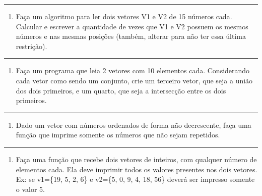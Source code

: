 \documentclass[12pt,a4paper]{article}
\renewcommand{\linethickness}{0.05em}
\providecommand{\tightlist}{%
      \setlength{\itemsep}{0pt}\setlength{\parskip}{0pt}}
\begin{document}
    \begin{center}\rule{0.5\linewidth}{\linethickness}\end{center}

\begin{enumerate}
\def\labelenumi{\arabic{enumi}.}
\setcounter{enumi}{11}
\tightlist
\item
  Faça um algoritmo para ler dois vetores V1 e V2 de 15 números cada.
  Calcular e escrever a quantidade de vezes que V1 e V2 possuem os
  mesmos números e nas mesmas posições (também, alterar para não ter
  essa última restrição).
\end{enumerate}

    \begin{center}\rule{0.5\linewidth}{\linethickness}\end{center}

\begin{enumerate}
\def\labelenumi{\arabic{enumi}.}
\setcounter{enumi}{12}
\tightlist
\item
  Faça um programa que leia 2 vetores com 10 elementos cada.
  Considerando cada vetor como sendo um conjunto, crie um terceiro
  vetor, que seja a união dos dois primeiros, e um quarto, que seja a
  intersecção entre os dois primeiros.
\end{enumerate}

    \begin{center}\rule{0.5\linewidth}{\linethickness}\end{center}

\begin{enumerate}
\def\labelenumi{\arabic{enumi}.}
\setcounter{enumi}{13}
\tightlist
\item
  Dado um vetor com números ordenados de forma não decrescente, faça uma
  função que imprime somente os números que não sejam repetidos.
\end{enumerate}

    \begin{center}\rule{0.5\linewidth}{\linethickness}\end{center}

\begin{enumerate}
\def\labelenumi{\arabic{enumi}.}
\setcounter{enumi}{14}
\tightlist
\item
  Faça uma função que recebe dois vetores de inteiros, com qualquer
  número de elementos cada. Ela deve imprimir todos os valores presentes
  nos dois vetores. Ex: se v1=\{19, 5, 2, 6\} e v2=\{5, 0, 9, 4, 18,
  56\} deverá ser impresso somente o valor 5.
\end{enumerate}
\end{document}
